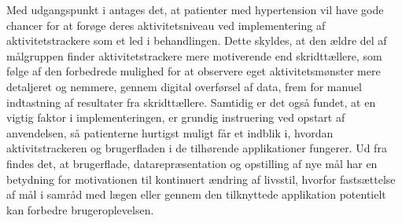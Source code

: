 Med udgangspunkt i \citeauthor{mercer2016} antages det, at patienter med hypertension vil have gode chancer for at forøge deres aktivitetsniveau ved implementering af aktivitetstrackere som et led i behandlingen. Dette skyldes, at den ældre del af målgruppen finder aktivitetstrackere mere motiverende end skridttællere, som følge af den forbedrede mulighed for at observere eget aktivitetsmønster mere detaljeret og nemmere, gennem digital overførsel af data, frem for manuel indtastning af resultater fra skridttællere. Samtidig er det også fundet, at en vigtig faktor i implementeringen, er grundig instruering ved opstart af anvendelsen, så patienterne hurtigst muligt får et indblik i, hvordan aktivitstrackeren og brugerfladen i de tilhørende applikationer fungerer. Ud fra \citeauthor{rapp2016} findes det, at brugerflade, datarepræsentation og opstilling af nye mål har en betydning for motivationen til kontinuert ændring af livsstil, hvorfor fastsættelse af mål i samråd med lægen eller gennem den tilknyttede applikation potentielt kan forbedre brugeroplevelsen.


